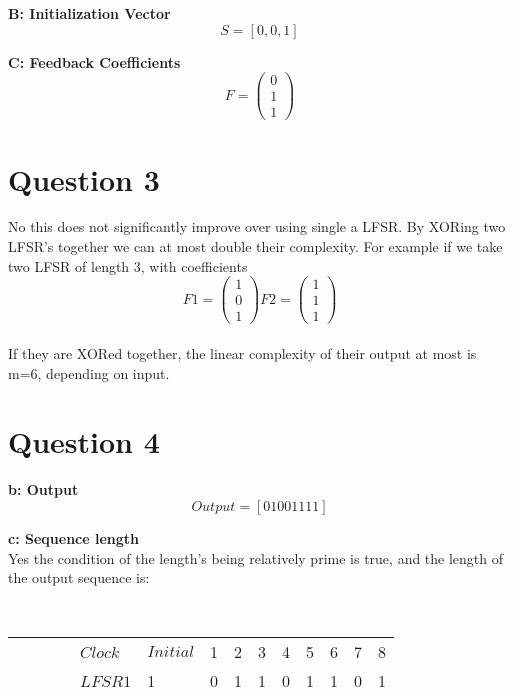 \documentclass[12pt]{article}
\begin{document}
\textbf{B: Initialization Vector}
\[ S=[0, 0, 1] \]

\textbf{C: Feedback Coefficients}
\[ F=\left( \begin{array}{c}
0\\
1\\
1\end{array} \right) \]

\section{Question 3}
No this does not significantly improve over using single a LFSR.  By XORing two LFSR's together we can at most double their complexity.  For example if we take two LFSR of length 3, with coefficients \[ F1=\left( \begin{array}{c}
1\\
0\\
1\end{array} \right) 
 F2=\left( \begin{array}{c}
1\\
1\\
1\end{array} \right)\]\\

If they are XORed together, the linear complexity of their output at most is m=6, depending on input.

\section{Question 4}
\textbf{b: Output}\\
\[Output=[0 1 0 0 1 1 1 1] \]

\textbf{c: Sequence length}\\
Yes the condition of the length's being relatively prime is true, and the length of the output sequence is: 

\begin{table}
    \begin{tabular}{|l|l|l|l|l|l|l|l|l|l|}
        $Clock$ & $Initial$ & 1 & 2 & 3 & 4 & 5 & 6 & 7 & 8 \\
        $LFSR1$ &       1 & 0 & 1 & 1 & 0 & 1 & 1 & 0 & 1 \\ 
        $LFSR2$ &	1 & 0 & 0 & 0 & 0 & 1 & 1 & 1 & 1  \\
        $LFSR3$ &	1 & 1 & 0 & 0 & 0 & 0 & 0 & 0 & 0  \\ 
	$Output$ &      0 & 1 & 0 & 0 & 0 & 1 & 1 & 1 & 1 \\
    \end{tabular}
\end{table}

 
\end{document}
